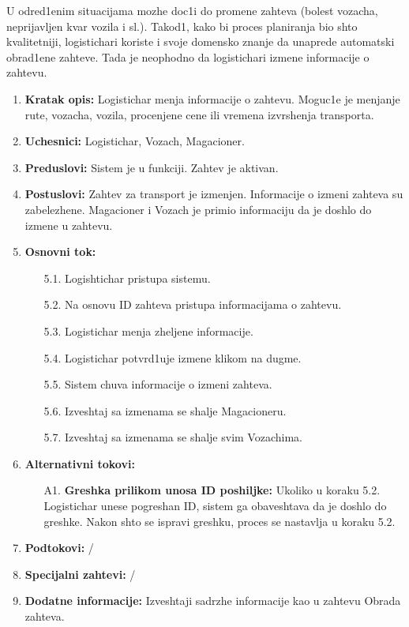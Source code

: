 
U odred1enim situacijama mozhe doc1i do promene zahteva (bolest vozacha, neprijavljen kvar vozila i sl.).
Takod1, kako bi proces planiranja bio shto kvalitetniji, logistichari koriste i svoje domensko znanje da unaprede automatski obrad1ene zahteve.
 Tada je neophodno da logistichari izmene informacije o zahtevu.
\begin{enumerate}
    \item \textbf{Kratak opis:} Logistichar menja informacije o zahtevu. Moguc1e je menjanje rute, vozacha, vozila, procenjene cene ili vremena izvrshenja transporta. 
    
    \item \textbf{Uchesnici:} Logistichar, Vozach, Magacioner.
    \item \textbf{Preduslovi:} Sistem je u funkciji. Zahtev je aktivan.
    \item \textbf{Postuslovi:} Zahtev za transport je izmenjen. Informacije o izmeni zahteva su zabelezhene. Magacioner i Vozach je primio informaciju da je doshlo do izmene u zahtevu.
    \item \textbf{Osnovni tok:}
        \begin{enumerate}
            \item[5.1.] Logishtichar pristupa sistemu. 
            \item[5.2.] Na osnovu ID zahteva pristupa informacijama o zahtevu.
            
            \item[5.3.] Logistichar menja zheljene informacije. 
            \item[5.4.] Logistichar potvrd1uje izmene klikom na dugme.
            
            \item[5.5.] Sistem chuva informacije o izmeni zahteva.
            \item[5.6.] Izveshtaj sa izmenama se shalje Magacioneru.
            \item[5.7.] Izveshtaj sa izmenama se shalje svim Vozachima.
            
        \end{enumerate}
    \item \textbf{Alternativni tokovi:}
            \begin{enumerate}
                \item [A1.] \textbf{Greshka prilikom unosa ID poshiljke: }
                Ukoliko u koraku 5.2. Logistichar unese pogreshan ID, sistem ga obaveshtava da je doshlo do greshke. 
                Nakon shto se ispravi greshku, proces se nastavlja u koraku 5.2.
            \end{enumerate}
        
    \item \textbf{Podtokovi:} /
    \item \textbf{Specijalni zahtevi:} /
    \item \textbf{Dodatne informacije:} Izveshtaji sadrzhe informacije kao u zahtevu Obrada zahteva.
    
\end{enumerate}



